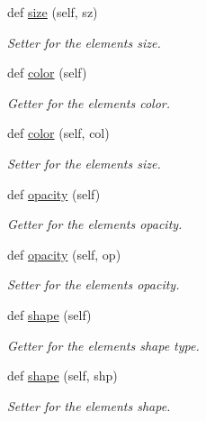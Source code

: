 \begin{DoxyCompactItemize}
def \hyperlink{classbridges_1_1element_1_1_element_afbb37ab4474c2ac1b7da950fb06819ed}{size} (self, sz)
\begin{DoxyCompactList}\small\item\em Setter for the element\textquotesingle{}s size. \end{DoxyCompactList}\item 
def \hyperlink{classbridges_1_1element_1_1_element_af8bf34079130638064db0b03ef5bb79a}{color} (self)
\begin{DoxyCompactList}\small\item\em Getter for the element\textquotesingle{}s color. \end{DoxyCompactList}\item 
def \hyperlink{classbridges_1_1element_1_1_element_ace59b1eb4cf0d775e9afa31605183c50}{color} (self, col)
\begin{DoxyCompactList}\small\item\em Setter for the element\textquotesingle{}s size. \end{DoxyCompactList}\item 
def \hyperlink{classbridges_1_1element_1_1_element_a31ce56c32bd400a2d8d0e7e146c4b5f3}{opacity} (self)
\begin{DoxyCompactList}\small\item\em Getter for the element\textquotesingle{}s opacity. \end{DoxyCompactList}\item 
def \hyperlink{classbridges_1_1element_1_1_element_a1542425770b360b39369e3db7116d6ae}{opacity} (self, op)
\begin{DoxyCompactList}\small\item\em Setter for the element\textquotesingle{}s opacity. \end{DoxyCompactList}\item 
def \hyperlink{classbridges_1_1element_1_1_element_a4485e4854639bcb163a36d0629f0e8f9}{shape} (self)
\begin{DoxyCompactList}\small\item\em Getter for the element\textquotesingle{}s shape type. \end{DoxyCompactList}\item 
def \hyperlink{classbridges_1_1element_1_1_element_a54d45aa4c09c0b5745cebbabcc0c02f9}{shape} (self, shp)
\begin{DoxyCompactList}\small\item\em Setter for the element\textquotesingle{}s shape. \end{DoxyCompactList}\item 

\end{DoxyCompactItemize}
